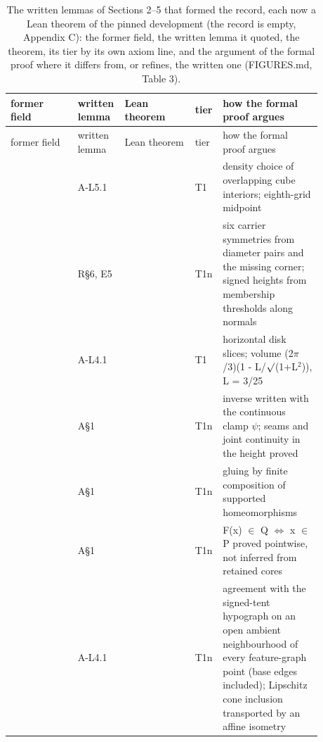 {\small
\begin{longtable}{L{0.21\linewidth} L{0.09\linewidth} L{0.22\linewidth} L{0.05\linewidth} L{0.31\linewidth}}
\caption{The written lemmas of Sections 2--5 that formed the  record, each now a Lean theorem of the pinned development (the record is empty, Appendix C): the former field, the written lemma it quoted, the theorem, its tier by its own axiom line, and the argument of the formal proof where it differs from, or refines, the written one (FIGURES.md, Table 3).}\label{tab:hypotheses}\\
\toprule
former field & written lemma & Lean theorem & tier & how the formal proof argues \\
\midrule
\endfirsthead
\toprule
former field & written lemma & Lean theorem & tier & how the formal proof argues \\
\midrule
\endhead
\bottomrule
\endfoot
{} & A-L5.1 &  & T1 & density choice of overlapping cube interiors; eighth-grid midpoint \\
 & R\S{}6, E5 &  & T1n & six carrier symmetries from diameter pairs and the missing corner; signed heights from membership thresholds along normals \\
 & A-L4.1 &  & T1 & horizontal disk slices; volume (2$\pi$/\allowbreak{}3)(1 - L/\allowbreak{}$\surd$(1+L$^2$)), L = 3/\allowbreak{}25 \\
 & A\S{}1 &  & T1n & inverse written with the continuous clamp $\psi$; seams and joint continuity in the height proved \\
 & A\S{}1 &  & T1n & gluing by finite composition of supported homeomorphisms \\
 & A\S{}1 &  & T1n & F(x) $\in$ Q $\Leftrightarrow$ x $\in$ P proved pointwise, not inferred from retained cores \\
 & A-L4.1 &  & T1n & agreement with the signed-tent hypograph on an open ambient neighbourhood of every feature-graph point (base edges included); Lipschitz cone inclusion transported by an affine isometry \\

\end{longtable}}
